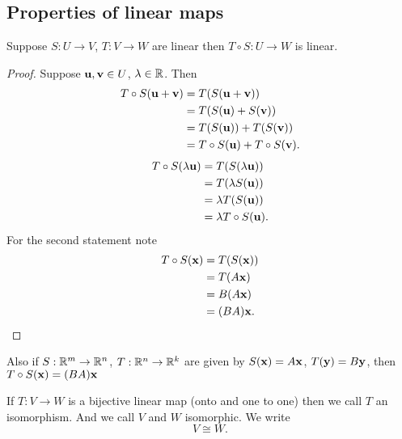 \documentclass[10pt, a4paper]{article}
\begin{document}
\subsection{Properties of linear maps}

\begin{lemma}
    Suppose $S : U \rightarrow V$,
    $T : V \rightarrow W$ are linear then $T \circ S : U \rightarrow W$ is linear.
    \begin{proof}
        Suppose $\mathbf{u, v} \in U$,
        $\lambda \in \mathbb{R}$.
        Then
        \begin{align*}
            T \circ S(\mathbf{u + v}) &= T(S(\mathbf{u + v})) \\
            &= T(S(\mathbf{u}) + S(\mathbf{v})) \\
            &= T(S(\mathbf{u})) + T(S(\mathbf{v})) \\
            &= T \circ S(\mathbf{u}) + T \circ S(\mathbf{v}).
        \end{align*}
        \begin{align*}
            T \circ S(\lambda\mathbf{u}) &= T(S(\lambda\mathbf{u})) \\
            &= T(\lambda S(\mathbf{u})) \\
            &= \lambda T(S(\mathbf{u})) \\
            &= \lambda T \circ S(\mathbf{u}).
        \end{align*}
        For the second statement note
        \begin{align*}
            T \circ S(\mathbf{x}) &= T(S(\mathbf{x})) \\
            &= T(A\mathbf{x}) \\
            &= B(A\mathbf{x}) \\
            &= (BA)\mathbf{x}.
        \end{align*}
    \end{proof}
\end{lemma}

Also if $S : \mathbb{R} ^ m \rightarrow \mathbb{R} ^ n$,
$T : \mathbb{R} ^ n \rightarrow \mathbb{R} ^ k$ are given by $S(\mathbf{x}) = A\mathbf{x}$,
$T(\mathbf{y}) = B\mathbf{y}$,
then $T \circ S(\mathbf{x}) = (BA)\mathbf{x}$

\begin{definition}[Isomorphism]
    If $T : V \rightarrow W$ is a bijective linear map
    (onto and one to one)
    then we call $T$ an isomorphism.
    And we call $V$ and $W$ isomorphic.
    We write
    \[
    V \cong W.
    \]
\end{definition}
\end{document}

